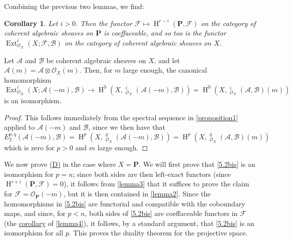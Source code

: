 \documentclass{article}
\theoremstyle{plain}
\newenvironment{lemma}[1]
  {\renewcommand\theinnercustomlemma{#1}\innercustomlemma}
  {\endinnercustomlemma}
\newtheorem*{corollary*}{Corollary}
\theoremstyle{definition}
\newcommand{\sh}{\mathscr}
\newcommand{\bb}{\mathbf}
\DeclareMathOperator{\Ext}{Ext}
\DeclareMathOperator{\shExt}{\underline{Ext}}
\DeclareMathOperator{\HH}{H}
\newcommand{\oldpage}[1]{\marginpar{\footnotesize$\Big\vert$ \textit{p.~#1}}}
\begin{document}
Combining the previous two lemmas, we find:

\begin{corollary*}
\label{lemma3andlemma4corollary}
  Let $i>0$.
  Then the functor $\sh{F}\mapsto\HH^{r-i}(\bb{P},\sh{F})$ on the category of coherent algebraic sheaves on $\bb{P}$ is coeffaceable, and so too is the functor $\Ext_{\sh{O}_X}^i(X;\sh{F},\sh{B})$ on the category of coherent algebraic sheaves on $X$.
\end{corollary*}

\oldpage{149-16}
\begin{lemma}{5}
\label{lemma5}
  Let $\sh{A}$ and $\sh{B}$ be coherent algebraic sheaves on $X$, and let $\sh{A}(m)=\sh{A}\otimes\sh{O}_X(m)$.
  Then, for $m$ large enough, the canonical homomorphism
  \[
    \Ext_{\sh{O}_X}^i(X;\sh{A}(-m),\sh{B})
    \to \HH^0(X,\shExt_{\sh{O}_X}^i(\sh{A}(-m),\sh{B}))
    = \HH^0(X,\shExt_{\sh{O}_X}^i(\sh{A},\sh{B})(m))
  \]
  is an isomorphism.
\end{lemma}

\begin{proof}
  This follows immediately from the spectral sequence in \cref{proposition1} applied to $\sh{A}(-m)$ and $\sh{B}$, since we then have that
  \[
    E_2^{p,q}(\sh{A}(-m),\sh{B})
    = \HH^p(X,\shExt_{\sh{O}_X}^q(\sh{A}(-m),\sh{B}))
    = \HH^p(X,\shExt_{\sh{O}_X}^q(\sh{A},\sh{B})(m))
  \]
  which is zero for $p>0$ and $m$ large enough.
\end{proof}

We now prove \hyperref[(D)]{(D)} in the case where $X=\bb{P}$.
We will first prove that \cref{5.2bis} is an isomorphism for $p=n$;
since both sides are then left-exact functors (since $\HH^{r+i}(\bb{P},\sh{F})=0$), it follows from \cref{lemma3} that it suffices to prove the claim for $\sh{F}=\sh{O}_\bb{P}(-m)$, but it is then contained in \cref{lemma2}.
Since the homomorphisms in \cref{5.2bis} are functorial and compatible with the coboundary maps, and since, for $p<n$, both sides of \cref{5.2bis} are coeffaceable functors in $\sh{F}$ (the \hyperref[lemma3andlemma4corollary]{corollary} of \cref{lemma4}), it follows, by a standard argument, that \cref{5.2bis} is an isomorphism for all $p$.
This proves the duality theorem for the projective space.
\end{document}
